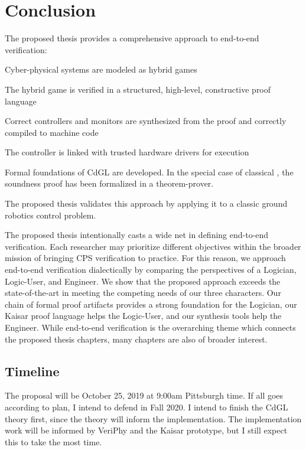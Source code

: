 \documentclass[12pt]{cmuthesis}
\theoremstyle{definition}
\theoremstyle{remark}
\newcommand{\CdGL}{\textsf{CdGL}\xspace}
\newcommand{\VeriPhy}{VeriPhy\xspace}
\begin{document}
\chapter{Conclusion}
The proposed thesis provides a comprehensive approach to end-to-end verification:
\begin{inparaenum}[i)]
\item Cyber-physical systems are modeled as hybrid games
\item The hybrid game is verified in a structured, high-level, constructive proof language
\item Correct controllers and monitors are synthesized from the proof and correctly compiled to machine code
\item The controller is linked with trusted hardware drivers for execution
\item Formal foundations of \CdGL are developed.
In the special case of classical \dL, the soundness proof has been formalized in a theorem-prover.
\end{inparaenum}
The proposed thesis validates this approach by applying it to a classic ground robotics control problem.

The proposed thesis intentionally casts a wide net in defining end-to-end verification.
Each researcher may prioritize different objectives within the broader mission of bringing CPS verification to practice.
For this reason, we approach end-to-end verification dialectically by comparing the perspectives of a Logician, Logic-User, and Engineer.
We show that the proposed approach exceeds the state-of-the-art in meeting the competing needs of our three characters.
Our chain of formal proof artifacts provides a strong foundation for the Logician, our Kaisar proof language helps the Logic-User, and our synthesis tools help the Engineer.
While end-to-end verification is the overarching theme which connects the proposed thesis chapters, many chapters are also of broader interest.

\section{Timeline}
The proposal will be October 25, 2019 at 9:00am Pittsburgh time.
If all goes according to plan, I intend to defend in Fall 2020.
I intend to finish the \CdGL theory first, since the theory will inform the implementation.
The implementation work will be informed by \VeriPhy and the Kaisar prototype, but I still expect this to take the most time.
\end{document}
